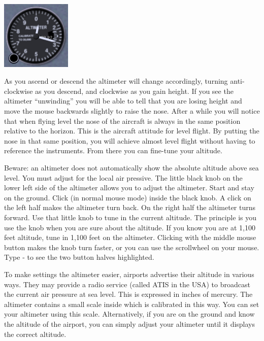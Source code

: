 \begin{itemize}
\begin{center}
\includegraphics[width=0.25\textwidth]{img/tut_17}
\end{center}

As you ascend or descend the altimeter will change accordingly, turning
anti-clockwise as you descend, and clockwise as you gain height. If you see
the altimeter ``unwinding'' you will be able to tell that you are losing height
and move the mouse backwards slightly to raise the nose.
After a while you will notice that when flying level the nose of the aircraft
is always in the same position relative to the horizon. This is the aircraft
attitude for level flight. By putting the nose in that same position, you will
achieve almost level flight without having to reference the instruments. From
there you can fine-tune your altitude.

Beware: an altimeter does not automatically show the absolute altitude
above sea level. You must adjust for the local air
pressive. The little black knob on the lower left side of the
altimeter allows you to adjust the altimeter. Start
\FlightGear{} and stay on the ground. Click (in normal mouse mode) inside the
black knob. A click on the left half makes the altimeter turn back. On the
right half the altimeter turns forward. Use that little knob to tune in the
current altitude. The principle is you use the knob when you are sure about
the altitude. If you know you are at 1,100 feet altitude, tune in 1,100 feet
on the altimeter. Clicking with the middle mouse button makes the knob
turn faster, or you can use the scrollwheel on your mouse.
Type - to see the two button halves highlighted.

To make settings the altimeter easier, airports advertise their altitude in
various ways. They may provide a radio service (called ATIS in the USA)
to broadcast the current air pressure at sea level. This is expressed in
inches of mercury. The altimeter contains a small scale inside which is
calibrated in this way. You can set your altimeter using this scale.
Alternatively, if you are on the ground and know the altitude of the airport,
you can simply adjust your altimeter until it displays the correct altitude.


\end{itemize}
